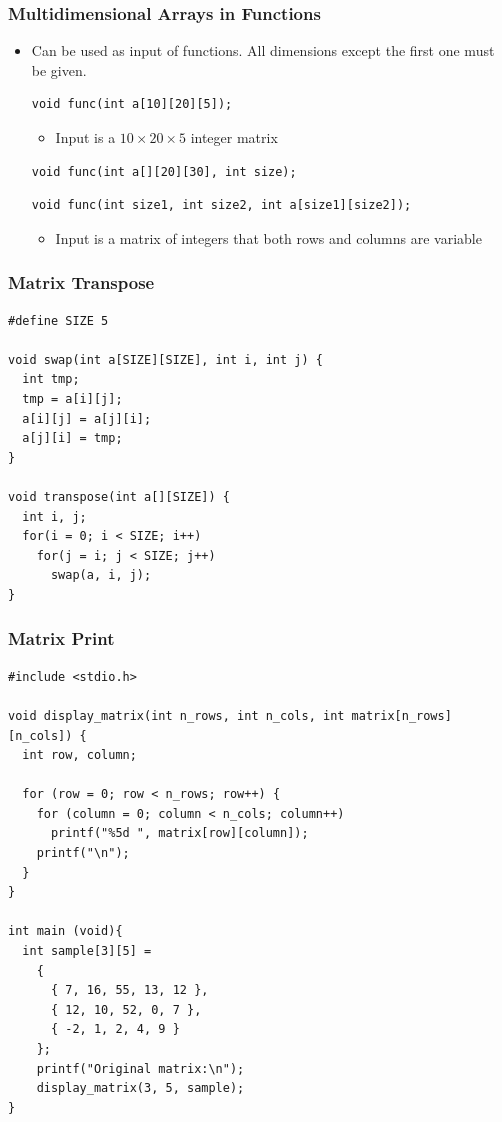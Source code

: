 \documentclass{../c-lecture}
\begin{document}
\begin{frame}[fragile]
  \frametitle{Multidimensional Arrays in Functions}
  \begin{itemize}
    \item
      Can be used as input of functions. All dimensions except the first one
      {\color{YellowOrange} must} be given.

    \begin{verbatim}
void func(int a[10][20][5]);
    \end{verbatim}
    \begin{itemize}
      \item Input is a $10 \times 20 \times 5$ integer matrix
    \end{itemize}
    \begin{verbatim}
void func(int a[][20][30], int size);
    \end{verbatim}
    \begin{verbatim}
void func(int size1, int size2, int a[size1][size2]);
    \end{verbatim}
    \begin{itemize}
      \item
        Input is a matrix of integers that both rows and columns are variable

    \end{itemize}
  \end{itemize}
\end{frame}

\begin{frame}[fragile]
  \frametitle{Matrix Transpose}
  \begin{verbatim}
#define SIZE 5

void swap(int a[SIZE][SIZE], int i, int j) {
  int tmp;
  tmp = a[i][j];
  a[i][j] = a[j][i];
  a[j][i] = tmp;
}

void transpose(int a[][SIZE]) {
  int i, j;
  for(i = 0; i < SIZE; i++)
    for(j = i; j < SIZE; j++)
      swap(a, i, j);
}
  \end{verbatim}
\end{frame}

\begin{frame}[fragile]
  \frametitle{Matrix Print}
  \begin{verbatim}
#include <stdio.h>

void display_matrix(int n_rows, int n_cols, int matrix[n_rows][n_cols]) {
  int row, column;

  for (row = 0; row < n_rows; row++) {
    for (column = 0; column < n_cols; column++)
      printf("%5d ", matrix[row][column]);
    printf("\n");
  }
}

int main (void){
  int sample[3][5] =
    {
      { 7, 16, 55, 13, 12 },
      { 12, 10, 52, 0, 7 },
      { -2, 1, 2, 4, 9 }
    };
    printf("Original matrix:\n");
    display_matrix(3, 5, sample);
}
  \end{verbatim}
\end{frame}
\end{document}
